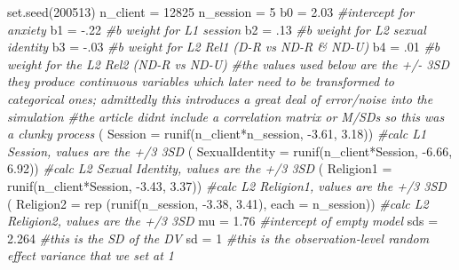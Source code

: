\documentclass[
  english,
]{book}
\newenvironment{Shaded}{\begin{snugshade}}{\end{snugshade}}
\newcommand{\AttributeTok}[1]{\textcolor[rgb]{0.77,0.63,0.00}{#1}}
\newcommand{\CommentTok}[1]{\textcolor[rgb]{0.56,0.35,0.01}{\textit{#1}}}
\newcommand{\DecValTok}[1]{\textcolor[rgb]{0.00,0.00,0.81}{#1}}
\newcommand{\FloatTok}[1]{\textcolor[rgb]{0.00,0.00,0.81}{#1}}
\newcommand{\FunctionTok}[1]{\textcolor[rgb]{0.00,0.00,0.00}{#1}}
\newcommand{\NormalTok}[1]{#1}
\newcommand{\OtherTok}[1]{\textcolor[rgb]{0.56,0.35,0.01}{#1}}
\newcommand{\SpecialCharTok}[1]{\textcolor[rgb]{0.00,0.00,0.00}{#1}}
\begin{document}
\begin{Shaded}
\begin{Highlighting}[]
\FunctionTok{set.seed}\NormalTok{(}\DecValTok{200513}\NormalTok{)}
\NormalTok{n\_client }\OtherTok{=} \DecValTok{12825}
\NormalTok{n\_session }\OtherTok{=} \DecValTok{5}
\NormalTok{b0 }\OtherTok{=} \FloatTok{2.03} \CommentTok{\#intercept for anxiety}
\NormalTok{b1 }\OtherTok{=} \SpecialCharTok{{-}}\NormalTok{.}\DecValTok{22} \CommentTok{\#b weight for L1 session}
\NormalTok{b2 }\OtherTok{=}\NormalTok{ .}\DecValTok{13} \CommentTok{\#b weight for L2 sexual identity}
\NormalTok{b3 }\OtherTok{=}  \SpecialCharTok{{-}}\NormalTok{.}\DecValTok{03} \CommentTok{\#b weight for L2 Rel1 (D{-}R vs ND{-}R \& ND{-}U)}
\NormalTok{b4 }\OtherTok{=}\NormalTok{ .}\DecValTok{01} \CommentTok{\#b weight for the L2 Rel2 (ND{-}R vs ND{-}U)}
\CommentTok{\#the values used below are the +/{-} 3SD they produce continuous variables which later need to be transformed to categorical ones; admittedly this introduces a great deal of error/noise into the simulation}
\CommentTok{\#the article didn\textquotesingle{}t include a correlation matrix or M/SDs so this was a clunky process }
\NormalTok{( }\AttributeTok{Session =} \FunctionTok{runif}\NormalTok{(n\_client}\SpecialCharTok{*}\NormalTok{n\_session, }\SpecialCharTok{{-}}\FloatTok{3.61}\NormalTok{, }\FloatTok{3.18}\NormalTok{)) }\CommentTok{\#calc L1 Session, values are the +/3 3SD}
\NormalTok{( }\AttributeTok{SexualIdentity =} \FunctionTok{runif}\NormalTok{(n\_client}\SpecialCharTok{*}\NormalTok{Session, }\SpecialCharTok{{-}}\FloatTok{6.66}\NormalTok{, }\FloatTok{6.92}\NormalTok{)) }\CommentTok{\#calc L2 Sexual Identity, values are the +/3 3SD}
\NormalTok{( }\AttributeTok{Religion1 =} \FunctionTok{runif}\NormalTok{(n\_client}\SpecialCharTok{*}\NormalTok{Session, }\SpecialCharTok{{-}}\FloatTok{3.43}\NormalTok{, }\FloatTok{3.37}\NormalTok{)) }\CommentTok{\#calc L2 Religion1, values are the +/3 3SD}
\NormalTok{( }\AttributeTok{Religion2 =} \FunctionTok{rep}\NormalTok{ (}\FunctionTok{runif}\NormalTok{(n\_session, }\SpecialCharTok{{-}}\FloatTok{3.38}\NormalTok{, }\FloatTok{3.41}\NormalTok{), }\AttributeTok{each =}\NormalTok{ n\_session)) }\CommentTok{\#calc L2 Religion2, values are the +/3 3SD}
\NormalTok{mu }\OtherTok{=} \FloatTok{1.76} \CommentTok{\#intercept of empty model }
\NormalTok{sds }\OtherTok{=} \FloatTok{2.264} \CommentTok{\#this is the SD of the DV}
\NormalTok{sd }\OtherTok{=} \DecValTok{1} \CommentTok{\#this is the observation{-}level random effect variance that we set at 1}


\end{Highlighting}
\end{Shaded}
\end{document}
